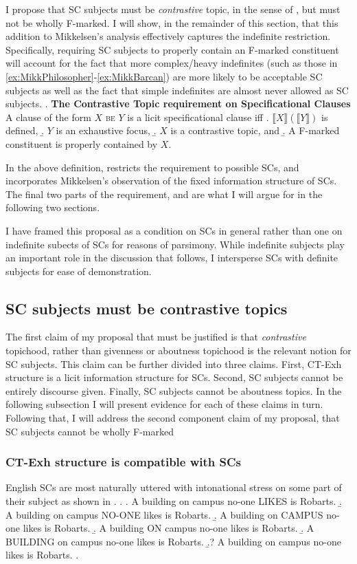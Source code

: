 \documentclass[
	letterpaper,
]{article}
\begin{document}
I propose that SC subjects must be \textit{contrastive} topic, in the sense of \textcite{constant2014diss}, but must not be wholly F-marked.
I will show, in the remainder of this section, that this addition to Mikkelsen's analysis effectively captures the indefinite restriction.
Specifically, requiring SC subjects to properly contain an F-marked constituent will account for the fact that more complex/heavy indefinites (such as those in \ref{ex:MikkPhilosopher}-\ref{ex:MikkBarcan}) are more likely to be acceptable SC subjects as well as the fact that simple indefinites are almost never allowed as SC subjects.
\ex.\label{ex:CTReq} \textbf{The Contrastive Topic requirement on Specificational Clauses}\\
A clause of the form $X$ \textsc{be} $Y$ is a licit specificational clause iff
\a. $\llbracket X\rrbracket(\llbracket Y\rrbracket)$ is defined,
\b. $Y$ is an exhaustive focus, \parencite{mikkelsen2005copular}
\b. $X$ is a contrastive topic, and
\b. A F-marked constituent is properly contained by $X$.

In the above definition, \Last[a] restricts the requirement to possible SCs, and \Last[b] incorporates Mikkelsen's observation of the fixed information structure of SCs.
The final two parts of the requirement, \Last[c] and \Last[d] are what I will argue for in the following two sections.

I have framed this proposal as a condition on SCs in general rather than one on indefinite subects of SCs for reasons of parsimony.
While indefinite subjects play an important role in the discussion that follows, I intersperse SCs with definite subjects for ease of demonstration.

\subsection{SC subjects must be contrastive topics}
The first claim of my proposal that must be justified is that \textit{contrastive} topichood, rather than givenness or aboutness topichood is the relevant notion for SC subjects.
This claim can be further divided into three claims.
First, CT-Exh structure is a licit information structure for SCs.
Second, SC subjects cannot be entirely discourse given.
Finally, SC subjects cannot be aboutness topics.
In the following subsection I will present evidence for each of these claims in turn.
Following that, I will address the second component claim of my proposal, that SC subjects cannot be wholly F-marked
\subsubsection{CT-Exh structure is compatible with SCs}\label{sec:CanBeCTs}
English SCs are most naturally uttered with intonational stress on some part of their subject as shown in \Next.
\ex.
\a. A building on campus no-one LIKES is Robarts.
\b. A building on campus NO-ONE likes is Robarts.
\b. A building on CAMPUS no-one likes is Robarts.
\b. A building ON campus no-one likes is Robarts.
\b. A BUILDING on campus no-one likes is Robarts.
\b.? A building on campus no-one likes is Robarts.
\z.
\end{document}
